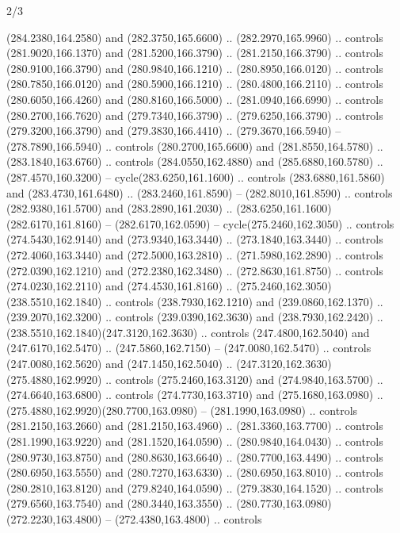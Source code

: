 \begin{flagdescription}{2/3}
\begin{scope}[xshift=0.5\flaglength,yshift=0.5\flagwidth,scale=\flagwidth/259.2]
\begin{scope}[y=0.8pt, x=0.8pt, yscale=-1,shift={(-243,-162)}]
      (284.2380,164.2580) and (282.3750,165.6600) .. (282.2970,165.9960) .. controls
      (281.9020,166.1370) and (281.5200,166.3790) .. (281.2150,166.3790) .. controls
      (280.9100,166.3790) and (280.9840,166.1210) .. (280.8950,166.0120) .. controls
      (280.7850,166.0120) and (280.5900,166.1210) .. (280.4800,166.2110) .. controls
      (280.6050,166.4260) and (280.8160,166.5000) .. (281.0940,166.6990) .. controls
      (280.2700,166.7620) and (279.7340,166.3790) .. (279.6250,166.3790) .. controls
      (279.3200,166.3790) and (279.3830,166.4410) .. (279.3670,166.5940) --
      (278.7890,166.5940) .. controls (280.2700,165.6600) and (281.8550,164.5780) ..
      (283.1840,163.6760) .. controls (284.0550,162.4880) and (285.6880,160.5780) ..
      (287.4570,160.3200) -- cycle(283.6250,161.1600) .. controls
      (283.6880,161.5860) and (283.4730,161.6480) .. (283.2460,161.8590) --
      (282.8010,161.8590) .. controls (282.9380,161.5700) and (283.2890,161.2030) ..
      (283.6250,161.1600)(282.6170,161.8160) -- (282.6170,162.0590) --
      cycle(275.2460,162.3050) .. controls (274.5430,162.9140) and
      (273.9340,163.3440) .. (273.1840,163.3440) .. controls (272.4060,163.3440) and
      (272.5000,163.2810) .. (271.5980,162.2890) .. controls (272.0390,162.1210) and
      (272.2380,162.3480) .. (272.8630,161.8750) .. controls (274.0230,162.2110) and
      (274.4530,161.8160) .. (275.2460,162.3050)(238.5510,162.1840) .. controls
      (238.7930,162.1210) and (239.0860,162.1370) .. (239.2070,162.3200) .. controls
      (239.0390,162.3630) and (238.7930,162.2420) ..
      (238.5510,162.1840)(247.3120,162.3630) .. controls (247.4800,162.5040) and
      (247.6170,162.5470) .. (247.5860,162.7150) -- (247.0080,162.5470) .. controls
      (247.0080,162.5620) and (247.1450,162.5040) ..
      (247.3120,162.3630)(275.4880,162.9920) .. controls (275.2460,163.3120) and
      (274.9840,163.5700) .. (274.6640,163.6800) .. controls (274.7730,163.3710) and
      (275.1680,163.0980) .. (275.4880,162.9920)(280.7700,163.0980) --
      (281.1990,163.0980) .. controls (281.2150,163.2660) and (281.2150,163.4960) ..
      (281.3360,163.7700) .. controls (281.1990,163.9220) and (281.1520,164.0590) ..
      (280.9840,164.0430) .. controls (280.9730,163.8750) and (280.8630,163.6640) ..
      (280.7700,163.4490) .. controls (280.6950,163.5550) and (280.7270,163.6330) ..
      (280.6950,163.8010) .. controls (280.2810,163.8120) and (279.8240,164.0590) ..
      (279.3830,164.1520) .. controls (279.6560,163.7540) and (280.3440,163.3550) ..
      (280.7730,163.0980)(272.2230,163.4800) -- (272.4380,163.4800) .. controls

\end{scope}
\end{scope}
\end{flagdescription}
